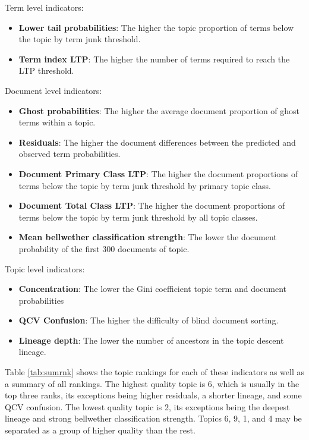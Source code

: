 \documentclass[]{book}
\providecommand{\tightlist}{%
  \setlength{\itemsep}{0pt}\setlength{\parskip}{0pt}}
\theoremstyle{definition}
\theoremstyle{definition}
\theoremstyle{definition}
\theoremstyle{remark}
\begin{document}
Term level indicators:

\begin{itemize}
\tightlist
\item
  \textbf{Lower tail probabilities}: The higher the topic proportion of
  terms below the topic by term junk threshold.
\item
  \textbf{Term index LTP}: The higher the number of terms required to
  reach the LTP threshold.
\end{itemize}

Document level indicators:

\begin{itemize}
\tightlist
\item
  \textbf{Ghost probabilities}: The higher the average document
  proportion of ghost terms within a topic.
\item
  \textbf{Residuals}: The higher the document differences between the
  predicted and observed term probabilities.
\item
  \textbf{Document Primary Class LTP}: The higher the document
  proportions of terms below the topic by term junk threshold by primary
  topic class.
\item
  \textbf{Document Total Class LTP}: The higher the document proportions
  of terms below the topic by term junk threshold by all topic classes.
\item
  \textbf{Mean bellwether classification strength}: The lower the
  document probability of the first 300 documents of topic.
\end{itemize}

Topic level indicators:

\begin{itemize}
\tightlist
\item
  \textbf{Concentration}: The lower the Gini coefficient topic term and
  document probabilities
\item
  \textbf{QCV Confusion}: The higher the difficulty of blind document
  sorting.
\item
  \textbf{Lineage depth}: The lower the number of ancestors in the topic
  descent lineage.
\end{itemize}

Table \ref{tab:sumrnk} shows the topic rankings for each of these
indicators as well as a summary of all rankings. The highest quality
topic is 6, which is usually in the top three ranks, its exceptions
being higher residuals, a shorter lineage, and some QCV confusion. The
lowest quality topic is 2, its exceptions being the deepest lineage and
strong bellwether classification strength. Topics 6, 9, 1, and 4 may be
separated as a group of higher quality than the rest.
\end{document}
